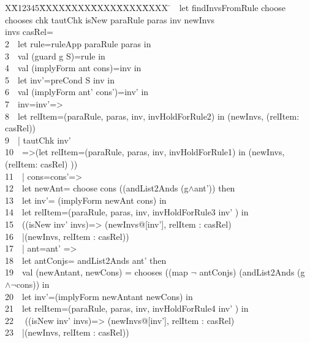 \documentclass{llncs}
\newlength{\fminilength}
\newenvironment{fmini}[1][\linewidth]
  {\setlength{\fminilength}{#1\fboxsep-2\fboxrule}%
   \vspace{2ex}\noindent\begin{lrbox}{\fminibox}\begin{minipage}{\fminilength}%
   \mbox{ }\hfill\vspace{-2.5ex}}%
  {\end{minipage}\end{lrbox}\vspace{1ex}\hspace{0ex}%
   \framebox{\usebox{\fminibox}}}
\newenvironment{specification}
{\noindent\scriptsize
\tt\begin{fmini}\begin{tabbing}X\=X12345\=XXXX\=XXXX\=XXXX\=XXXX\=XXXX
\=\+\kill} {\end{tabbing}\normalfont\end{fmini}}
\def \twoSpaces {\ \ }
\begin{document}
\begin{specification}
1\twoSpaces let findInvsFromRule  choose chooses chk tautChk isNew paraRule paras inv newInvs\\ invs casRel=\\
2\twoSpaces     let rule=ruleApp paraRule paras in\\
3\twoSpaces   val (guard g  S)=rule in\\
4\twoSpaces   val (implyForm ant cons)=inv in\\


5\twoSpaces   let inv'=preCond S inv in\\
6\twoSpaces   val (implyForm ant' cons')=inv' in\\


7\twoSpaces     inv=inv'=>\\

8\twoSpaces         let relItem=(paraRule, paras, inv, invHoldForRule2) in
         (newInvs, (relItem: casRel))\\



9\twoSpaces      | tautChk inv'\\
10\twoSpaces         =>(let relItem=(paraRule, paras, inv, invHoldForRule1) in         (newInvs, (relItem: casRel)   ))\\


11\twoSpaces       | cons=cons'=>\\

12\twoSpaces       let newAnt=  choose cons ((andList2Ands (g$\wedge$ant'))     then\\

13\twoSpaces       let inv'= (implyForm newAnt cons) in\\


14\twoSpaces       let relItem=(paraRule, paras, inv,  invHoldForRule3 inv'   ) in\\

15\twoSpaces       ((isNew inv' invs)=>           (newInvs@[inv'], relItem : casRel)\\
16\twoSpaces       |(newInvs,  relItem : casRel))\\

17\twoSpaces     | ant=ant' =>\\
18\twoSpaces        let antConjs= andList2Ands ant'  then\\

19\twoSpaces        val (newAntant, newCons) = chooses ((map $\neg$ antConjs) (andList2Ands (g$\wedge \neg$cons)) in\\
20\twoSpaces        let inv'=(implyForm newAntant newCons) in\\
21\twoSpaces        let relItem=(paraRule, paras, inv,  invHoldForRule4 inv'   ) in\\
22 \twoSpaces       ((isNew inv' invs)=>         (newInvs@[inv'], relItem : casRel)\\
23\twoSpaces       |(newInvs,  relItem : casRel))\\


\end{specification}
\end{document}
